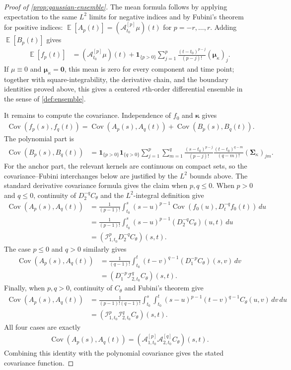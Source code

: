 \documentclass[11pt,a4paper]{article}
\theoremstyle{definition}
\theoremstyle{remark}
\DeclareMathOperator{\E}{\mathbb{E}}
\DeclareMathOperator{\Cov}{Cov}
\begin{document}
\begin{proof}[Proof of \cref{prop:gaussian-ensemble}]
The mean formula follows by applying expectation to the same \(L^2\) limits for negative indices and by Fubini's theorem for positive indices: $\E[A_p(t)] = (\mathcal A_{t_0}^{[p]}\mu)(t)$ for $p=-r,\ldots,r$. Adding \(\E[B_p(t)]\) gives
\begin{align*}
\E[f_p(t)]
&=
(\mathcal A_{t_0}^{[p]}\mu)(t)
+
\mathbf{1}_{\{p>0\}}
\sum_{j=1}^{p}\frac{(t-t_0)^{p-j}}{(p-j)!}(\boldsymbol\mu_\kappa)_j.
\end{align*}
If \(\mu\equiv0\) and \(\boldsymbol\mu_\kappa=\mathbf0\), this mean is zero for every component and time point; together with square-integrability, the derivative chain, and the boundary identities proved above, this gives a centered \(r\)th-order differential ensemble in the sense of \cref{def:ensemble}.

It remains to compute the covariance. Independence of \(f_0\) and \(\boldsymbol\kappa\) gives
\begin{align*}
\Cov(f_p(s),f_q(t))=\Cov(A_p(s),A_q(t))+\Cov(B_p(s),B_q(t)).
\end{align*}
The polynomial part is
\begin{align*}
\Cov(B_p(s),B_q(t))
&=
\mathbf{1}_{\{p>0\}}\mathbf{1}_{\{q>0\}}
\sum_{j=1}^{p}\sum_{m=1}^{q}
\frac{(s-t_0)^{p-j}}{(p-j)!}
\frac{(t-t_0)^{q-m}}{(q-m)!}
(\boldsymbol\Sigma_\kappa)_{jm}.
\end{align*}
For the anchor part, the relevant kernels are continuous on compact sets, so the covariance--Fubini interchanges below are justified by the \(L^2\) bounds above. The standard derivative covariance formula gives the claim when \(p,q\le0\). When \(p>0\) and \(q\le0\), continuity of \(D_2^{-q}C_\theta\) and the \(L^2\)-integral definition give
\begin{align*}
\Cov(A_p(s),A_q(t))
&=\frac{1}{(p-1)!}\int_{t_0}^s (s-u)^{p-1}
\Cov(f_0(u),D_t^{-q}f_0(t))\,du\\
&=\frac{1}{(p-1)!}\int_{t_0}^s (s-u)^{p-1}(D_2^{-q}C_\theta)(u,t)\,du\\
&=(\mathcal I_{1,t_0}^pD_2^{-q}C_\theta)(s,t).
\end{align*}
The case \(p\le0\) and \(q>0\) similarly gives
\begin{align*}
\Cov(A_p(s),A_q(t))
&=\frac{1}{(q-1)!}\int_{t_0}^t (t-v)^{q-1}(D_1^{-p}C_\theta)(s,v)\,dv\\
&=(D_1^{-p}\mathcal I_{2,t_0}^qC_\theta)(s,t).
\end{align*}
Finally, when \(p,q>0\), continuity of \(C_\theta\) and Fubini's theorem give
\begin{align*}
\Cov(A_p(s),A_q(t))
&=\frac{1}{(p-1)!(q-1)!}
\int_{t_0}^s\int_{t_0}^t
(s-u)^{p-1}(t-v)^{q-1}C_\theta(u,v)\,dv\,du\\
&=(\mathcal I_{1,t_0}^p\mathcal I_{2,t_0}^qC_\theta)(s,t).
\end{align*}
All four cases are exactly
\begin{align*}
\Cov(A_p(s),A_q(t))=(\mathcal A_{1,t_0}^{[p]}\mathcal A_{2,t_0}^{[q]}C_\theta)(s,t).
\end{align*}
Combining this identity with the polynomial covariance gives the stated covariance function.
\end{proof}
\end{document}
